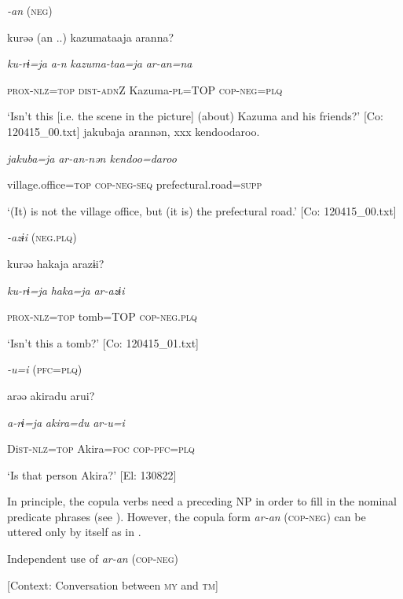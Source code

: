 \ea\label{ex:8-39}
  \textit{{}-an} (\textsc{neg})

\ea {\TM}
\glll  kurəə  (an ..)  kazumataaja  aranna?

      \textit{ku-rɨ=ja}  \textit{a-n}  \textit{kazuma-taa=ja}  \textit{ar-an=na}

      \textsc{prox}-\textsc{nlz}=\textsc{top}  \textsc{dist}-\textsc{adn}Z  Kazuma-\textsc{pl}=TOP  \textsc{cop}-\textsc{neg}=\textsc{plq}

\glt ‘Isn’t this [i.e. the scene in the picture] (about) Kazuma and his friends?’ [Co: 120415\_00.txt]
\ex {\TM}
\glll  jakubaja  arannən,  xxx  {\textbar}kendoo{\textbar}daroo.

      \textit{jakuba=ja}  \textit{ar-an{}-nən    kendoo=daroo}

      village.office=\textsc{top}  \textsc{cop}-\textsc{neg}-\textsc{seq}    prefectural.road=\textsc{supp}

\glt ‘(It) is not the village office, but (it is) the prefectural road.’ [Co: 120415\_00.txt]
\z

  \textit{{}-azɨi} (\textsc{neg}.\textsc{plq})

\ex {\TM}
\glll  kurəə  hakaja  arazɨi?

      \textit{ku-rɨ=ja}  \textit{haka=ja}  \textit{ar-azɨi}

      \textsc{prox}-\textsc{nlz}=\textsc{top}  tomb=TOP  \textsc{cop}-\textsc{neg}.\textsc{plq}

\glt ‘Isn’t this a tomb?’ [Co: 120415\_01.txt]
\z

  \textit{{}-u=i} (\textsc{pfc}=\textsc{plq})

\ex {\TM}
\glll  arəə  akiradu  arui?

      \textit{a-rɨ=ja}  \textit{akira=du}  \textit{ar-u=i}

      Di\textsc{st}-\textsc{nlz}=\textsc{top}  Akira=\textsc{foc}  \textsc{cop}-\textsc{pfc}=\textsc{plq}

\glt ‘Is that person Akira?’ [El: 130822]

  In principle, the copula verbs need a preceding NP in order to fill in the nominal predicate phrases (see ). However, the copula form \textit{ar-an} (\textsc{cop}-\textsc{neg}) can be uttered only by itself as in .

\ea\label{ex:8-40}
  Independent use of \textit{ar-an} (\textsc{cop}-\textsc{neg})

  [Context: Conversation between \textsc{my} and \textsc{tm}]

